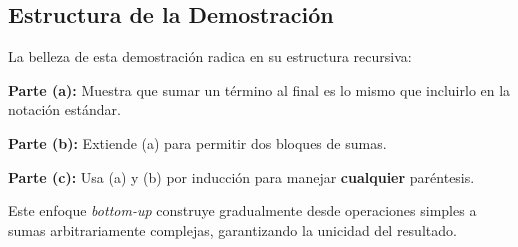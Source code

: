 \subsection*{Estructura de la Demostración}

La belleza de esta demostración radica en su estructura recursiva:

\vspace{0.5cm}

\textbf{Parte (a):} Muestra que sumar un término al final es lo mismo que incluirlo en la notación estándar.

\textbf{Parte (b):} Extiende (a) para permitir dos bloques de sumas.

\textbf{Parte (c):} Usa (a) y (b) por inducción para manejar \textbf{cualquier} paréntesis.

\vspace{0.5cm}

Este enfoque \textit{bottom-up} construye gradualmente desde operaciones simples a sumas arbitrariamente complejas, garantizando la unicidad del resultado.
